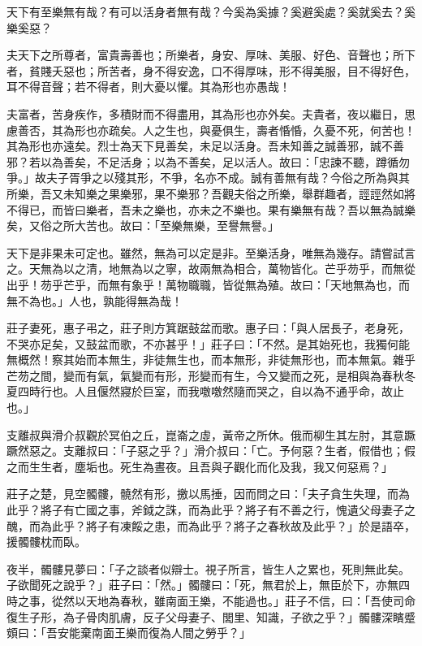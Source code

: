 
\begin{pinyinscope}
天下有至樂無有哉？有可以活身者無有哉？今奚為奚據？奚避奚處？奚就奚去？奚樂奚惡？

夫天下之所尊者，富貴壽善也；所樂者，身安、厚味、美服、好色、音聲也；所下者，貧賤夭惡也；所苦者，身不得安逸，口不得厚味，形不得美服，目不得好色，耳不得音聲；若不得者，則大憂以懼。其為形也亦愚哉！

夫富者，苦身疾作，多積財而不得盡用，其為形也亦外矣。夫貴者，夜以繼日，思慮善否，其為形也亦疏矣。人之生也，與憂俱生，壽者惛惛，久憂不死，何苦也！其為形也亦遠矣。烈士為天下見善矣，未足以活身。吾未知善之誠善邪，誠不善邪？若以為善矣，不足活身；以為不善矣，足以活人。故曰：「忠諫不聽，蹲循勿爭。」故夫子胥爭之以殘其形，不爭，名亦不成。誠有善無有哉？今俗之所為與其所樂，吾又未知樂之果樂邪，果不樂邪？吾觀夫俗之所樂，舉群趣者，誙誙然如將不得已，而皆曰樂者，吾未之樂也，亦未之不樂也。果有樂無有哉？吾以無為誠樂矣，又俗之所大苦也。故曰：「至樂無樂，至譽無譽。」

天下是非果未可定也。雖然，無為可以定是非。至樂活身，唯無為幾存。請嘗試言之。天無為以之清，地無為以之寧，故兩無為相合，萬物皆化。芒乎芴乎，而無從出乎！芴乎芒乎，而無有象乎！萬物職職，皆從無為殖。故曰：「天地無為也，而無不為也。」人也，孰能得無為哉！

莊子妻死，惠子弔之，莊子則方箕踞鼓盆而歌。惠子曰：「與人居長子，老身死，不哭亦足矣，又鼓盆而歌，不亦甚乎！」莊子曰：「不然。是其始死也，我獨何能無概然！察其始而本無生，非徒無生也，而本無形，非徒無形也，而本無氣。雜乎芒芴之間，變而有氣，氣變而有形，形變而有生，今又變而之死，是相與為春秋冬夏四時行也。人且偃然寢於巨室，而我噭噭然隨而哭之，自以為不通乎命，故止也。」

支離叔與滑介叔觀於冥伯之丘，崑崙之虛，黃帝之所休。俄而柳生其左肘，其意蹶蹶然惡之。支離叔曰：「子惡之乎？」滑介叔曰：「亡。予何惡？生者，假借也；假之而生生者，塵垢也。死生為晝夜。且吾與子觀化而化及我，我又何惡焉？」

莊子之楚，見空髑髏，髐然有形，撽以馬捶，因而問之曰：「夫子貪生失理，而為此乎？將子有亡國之事，斧鉞之誅，而為此乎？將子有不善之行，愧遺父母妻子之醜，而為此乎？將子有凍餒之患，而為此乎？將子之春秋故及此乎？」於是語卒，援髑髏枕而臥。

夜半，髑髏見夢曰：「子之談者似辯士。視子所言，皆生人之累也，死則無此矣。子欲聞死之說乎？」莊子曰：「然。」髑髏曰：「死，無君於上，無臣於下，亦無四時之事，從然以天地為春秋，雖南面王樂，不能過也。」莊子不信，曰：「吾使司命復生子形，為子骨肉肌膚，反子父母妻子、閭里、知識，子欲之乎？」髑髏深矉蹙頞曰：「吾安能棄南面王樂而復為人間之勞乎？」


\end{pinyinscope}
